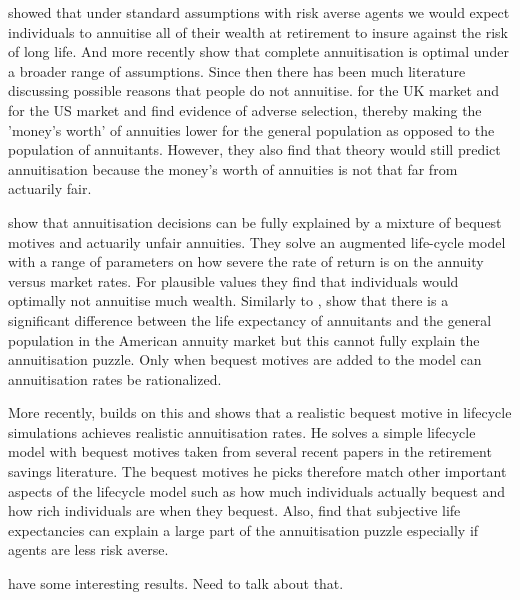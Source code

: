 \documentclass[12pt]{article}
\begin{document}
\cite{yaari_65} showed that under standard assumptions with risk averse agents
we would expect individuals to annuitise all of their wealth at retirement to
insure against the risk of long life. And more recently
\cite{davidoff_brown_diamond_aer_2005} show that complete annuitisation is
optimal under a broader range of assumptions.
Since then there has been much literature discussing possible reasons that
people do not annuitise. \cite{finkelstein_porteba_2002,
    finkelstein_porteba_2004} for the UK market and \cite{mitchell_et_al_1999} for
the US market and  find evidence of adverse selection, thereby making the
'money's worth' of annuities lower for the general population as opposed to the
population of annuitants. However, they also find that theory would still
predict annuitisation because the money's worth of annuities is not that far
from actuarily fair.

\cite{friedman_warshawsky_qje_1990} show that annuitisation decisions can be
fully explained by a mixture of bequest motives and actuarily unfair annuities.
They solve an augmented life-cycle model with a range of parameters on how
severe the rate of return is on the annuity versus market rates. For plausible
values they find that individuals would optimally not annuitise much wealth.
Similarly to \cite{finkelstein_porteba_2004},
\cite{friedman_warshawsky_chicago_1988} show that there is a significant
difference between the life expectancy of annuitants and the general population
in the American annuity market but this cannot fully explain the annuitisation
puzzle. Only when bequest motives are added to the model can annuitisation rates
be rationalized.

More recently, \cite{lockwood_red_2012} builds on this and shows that a
realistic bequest motive in lifecycle simulations achieves realistic
annuitisation rates. He solves a simple lifecycle model with bequest motives
taken from several recent papers in the retirement savings literature. The
bequest motives he picks therefore match other important aspects of the
lifecycle model such as how much individuals actually bequest and how rich
individuals are when they bequest. Also, \cite{odea_sturrock_rest_2023} find that subjective life expectancies can
explain a large part of the annuitisation puzzle especially if agents are less
risk averse.


\cite{lockwood_aer_2018}

\cite{vidalmelia_lejarragagarcia_munich_2004} have some interesting results.
Need to talk about that.
\end{document}
